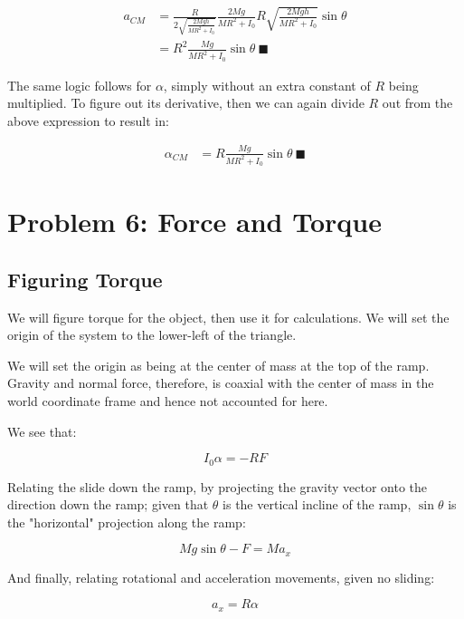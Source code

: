 \documentclass[letterpaper]{article}
\begin{document}
\begin{align}
   a_{CM} &= \frac{R}{2\sqrt{\frac{2Mgh}{M R^2 + I_0}}} \frac{2Mg}{M R^2 + I_0}  R\sqrt{\frac{2Mgh}{M R^2 + I_0}}\sin\theta\\
&= R^2  \frac{Mg}{M R^2 + I_0} \sin\theta\ \blacksquare
\end{align}

The same logic follows for \(\alpha\), simply without an extra constant of \(R\) being multiplied. To figure out its derivative, then we can again divide \(R\) out from the above expression to result in:

\begin{align}
   \alpha_{CM} &= R \frac{Mg}{M R^2 + I_0} \sin\theta\ \blacksquare
\end{align}

\section{Problem 6: Force and Torque}
\label{sec:org5abc2e0}

\subsection{Figuring Torque}
\label{sec:orge597245}
We will figure torque for the object, then use it for calculations. We will set the origin of the system to the lower-left of the triangle.

We will set the origin as being at the center of mass at the top of the ramp. Gravity and normal force, therefore, is coaxial with the center of mass in the world coordinate frame and hence not accounted for here.

We see that:

\begin{equation}
   I_0\alpha = -RF 
\end{equation}

Relating the slide down the ramp, by projecting the gravity vector onto the direction down the ramp; given that \(\theta\) is the vertical incline of the ramp, \(\sin\theta\) is the "horizontal" projection along the ramp:

\begin{equation}
Mg\sin\theta - F = Ma_x
\end{equation}

And finally, relating rotational and acceleration movements, given no sliding:

\begin{equation}
   a_x = R\alpha 
\end{equation}
\end{document}

